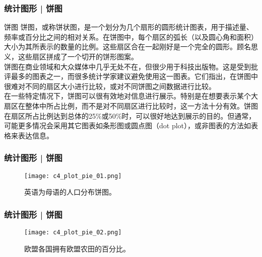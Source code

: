 \begin{frame}
  \frametitle{统计图形 | 饼图}
  \begin{block}{饼图}
饼图，或称饼状图，是一个划分为几个扇形的圆形统计图表，用于描述量、频率或百分比之间的相对关系。在饼图中，每个扇区的弧长（以及圆心角和面积）大小为其所表示的数量的比例。这些扇区合在一起刚好是一个完全的圆形。顾名思义，这些扇区拼成了一个切开的饼形图案。\\
\vspace{1em}
饼图在商业领域和大众媒体中几乎无处不在，但很少用于科技出版物。这是受到批评最多的图表之一，而\alert{很多统计学家建议避免使用这一图表}。它们指出，在饼图中很难对不同的扇区大小进行比较，或对不同饼图之间数据进行比较。\\
\vspace{0.5em}
在一些特定情况下，饼图可以很有效地对信息进行展示。特别是在想要表示某个大扇区在整体中所占比例，而不是对不同扇区进行比较时，这一方法十分有效。饼图在扇区所占比例达到总体的25\%或50\%时，可以很好地达到展示的目的。但通常，可能更多情况会采用其它图表如条形图或圆点图（dot plot），或非图表的方法如表格来表达信息。
  \end{block}
\end{frame}

\begin{frame}
  \frametitle{统计图形 | 饼图}
  \begin{figure}
    \centering
    \texttt{[image: c4\_plot\_pie\_01.png]}
    \caption{英语为母语的人口分布饼图。}
  \end{figure}
\end{frame}

\begin{frame}
  \frametitle{统计图形 | 饼图}
  \begin{figure}
    \centering
    \texttt{[image: c4\_plot\_pie\_02.png]}
    \caption{欧盟各国拥有欧盟农田的百分比。}
  \end{figure}
\end{frame}

